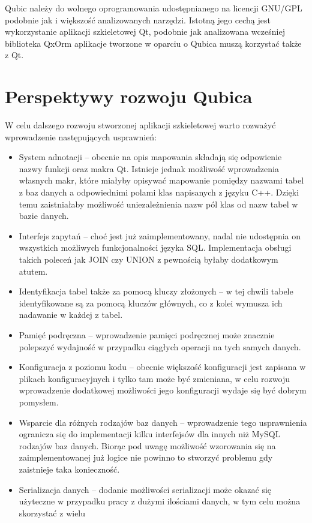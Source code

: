 \documentclass[12pt]{report}
\begin{document}
Qubic należy do wolnego oprogramowania udostępnianego na licencji GNU/GPL podobnie jak i większość analizowanych narzędzi. Istotną jego cechą jest wykorzystanie aplikacji
szkieletowej Qt, podobnie jak analizowana wcześniej biblioteka QxOrm aplikacje tworzone w oparciu o Qubica muszą korzystać także z Qt. 

\section{Perspektywy rozwoju Qubica} \label{perspektywyqubic}

W celu dalszego rozwoju stworzonej aplikacji szkieletowej warto rozważyć wprowadzenie następujących usprawnień:

\begin{itemize}
\item System adnotacji -- obecnie na opis mapowania składają się odpowienie nazwy funkcji oraz makra Qt. Istnieje jednak możliwość wprowadzenia własnych makr, które
miałyby opisywać mapowanie pomiędzy nazwami tabel z baz danych a odpowiednimi polami klas napisanych z języku C++. Dzięki temu zaistniałaby możliwość uniezależnienia
nazw pól klas od nazw tabel w bazie danych.
\item Interfejs zapytań -- choć jest już zaimplementowany, nadal nie udostępnia on wszystkich możliwych funkcjonalności języka SQL. Implementacja obsługi takich poleceń
jak JOIN czy UNION z pewnością byłaby dodatkowym atutem.
\item Identyfikacja tabel także za pomocą kluczy złożonych -- w tej chwili tabele identyfikowane są za pomocą kluczów głównych, co z kolei wymusza ich nadawanie w każdej
z tabel.
\item Pamięć podręczna -- wprowadzenie pamięci podręcznej może znacznie polepszyć wydajność w przypadku ciągłych operacji na tych samych danych.
\item Konfiguracja z poziomu kodu -- obecnie większość konfiguracji jest zapisana w plikach konfiguracyjnych i tylko tam może być zmieniana, w celu rozwoju wprowadzenie
dodatkowej możliwości jego konfiguracji wydaje się być dobrym pomysłem.
\item Wsparcie dla różnych rodzajów baz danych -- wprowadzenie tego usprawnienia ogranicza się do implementacji kilku interfejsów dla innych niż MySQL rodzajów baz 
danych. Biorąc pod uwagę możliwość wzorowania się na zaimplementowanej już logice nie powinno to stworzyć problemu gdy zaistnieje taka konieczność.
\item Serializacja danych -- dodanie możliwości serializacji może okazać się użyteczne w przypadku pracy z dużymi ilościami danych, w tym celu można skorzystać z wielu

\end{itemize}
\end{document}
